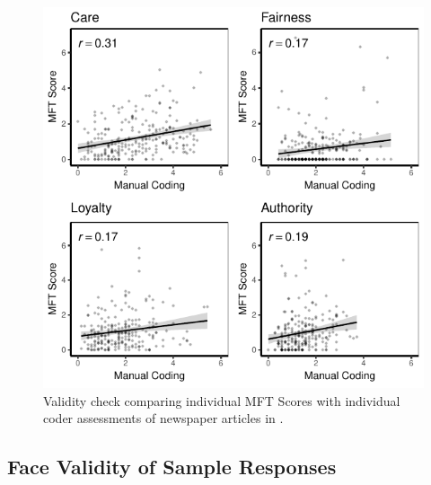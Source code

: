 \documentclass[12pt]{article}
\begin{document}
\begin{figure}[ht]\centering
\includegraphics{../calc/fig/feinberg_sep.pdf}
\caption{Validity check comparing individual MFT Scores with individual coder assessments of newspaper articles in \citet{feinberg2013moral}.}\label{fig:ols_feinberg_sep}
\end{figure}



\clearpage

\subsection{Face Validity of Sample Responses}
\end{document}
